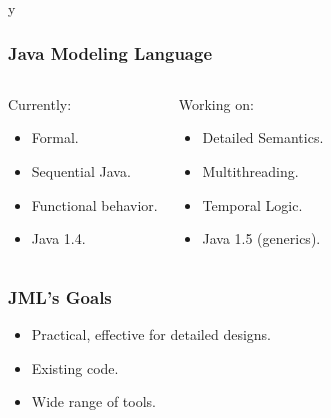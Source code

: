 \if y\MAKEHANDOUTS \documentclass[t,compress,landscape,handout]{beamer}
\begin{document}
\begin{frame}
\frametitle{Java Modeling Language}
\begin{columns}[t]
\begin{block}{Currently:}
\begin{itemize}
\item
Formal.

\item 
Sequential Java.

\item
Functional behavior.

\item
Java 1.4.
\end{itemize}
\end{block}

\pause

\begin{block}{Working on:}
\begin{itemize}
\item
Detailed Semantics.

\item 
Multithreading.

\item
Temporal Logic.

\item
Java 1.5 (generics).
\end{itemize}
\end{block}
\end{columns}
\end{frame}

\begin{frame}
\frametitle{JML's Goals}
\begin{itemize}
\item
Practical, effective for detailed designs.

\item
Existing code.

\item
Wide range of tools.
\end{itemize}
\end{frame}
\end{document}
